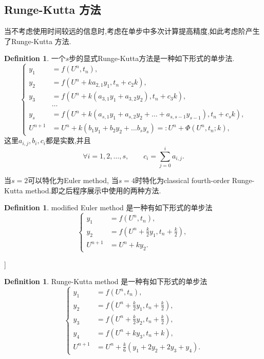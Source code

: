 \documentclass[a4paper]{book}
\numberwithin{equation}{chapter}
\theoremstyle{definition}
\newtheorem{defn}[thm]{Definition}
\begin{document}
\subsection{Runge-Kutta 方法}

当不考虑使用时间较远的信息时,考虑在单步中多次计算提高精度,如此考虑阶产生了Runge-Kutta 方法.
\begin{defn}
	一个$s$步的显式Runge-Kutta方法是一种如下形式的单步法.
	\begin{equation}
		\left\{
		\begin{aligned}
		y_1 &= f(U^n, t_n), \\
		y_2 &= f(U^n + k a_{2,1} y_1, t_n + c_2 k), \\
		y_3 &= f(U^n + k(a_{3,1} y_1 + a_{3,2} y_2), t_n + c_3 k) ,\\
		& \ldots \\
		y_s &= f(U^n + k(a_{s,1}y_1 + a_{s,2} y_2 + \dots + a_{s,s-1} y_{s-1}), t_n + c_s k), \\
		U^{n+1} &= U^n + k(b_1 y_1 + b_2 y_2 + \ldots b_s y_s) =: 
		U^n + \Phi(U^n, t_n; k),
		\end{aligned}
		\right.
	\end{equation}
	这里$a_{i,j}, b_i,c_i$都是实数,并且 
	\[\forall i = 1, 2, \ldots,s, \qquad c_i = \sum_{j=0}^{i} a_{i,j}.\]
\end{defn}

当$s = 2$可以特化为Euler method, 当$s = 4$时特化为classical fourth-order Runge-Kutta method.即之后程序展示中使用的两种方法.

\begin{defn}
	modified Euler method 是一种有如下形式的单步法
	\begin{equation}
	\left\{
	\begin{aligned}
	y_1 &= f(U^n, t_n), \\
	y_2 &= f(U^n + \frac{k}{2} y_1, t_n + \frac{k}{2}), \\
	U^{n+1} &= U^n + k y_2 .
	\end{aligned}
	\right.
	\end{equation}
\end{defn}

]\begin{defn}
	Runge-Kutta method 是一种有如下形式的单步法
	\begin{equation}
	\left\{
	\begin{aligned}
	y_1 &= f(U^n, t_n), \\
	y_2 &= f(U^n + \frac{k}{2} y_1, t_n + \frac{k}{2}), \\
	y_3 &= f(U^n + \frac{k}{2} y_2, t_n + \frac{k}{2}), \\
	y_4 &= f(U^n + k y_3, t_n + k), \\
	U^{n+1} &= U^n + \frac{k}{6}(y_1 + 2 y_2 + 2 y_3 + y_4).
	\end{aligned}
	\right.
	\end{equation}
\end{defn}
\end{document}
